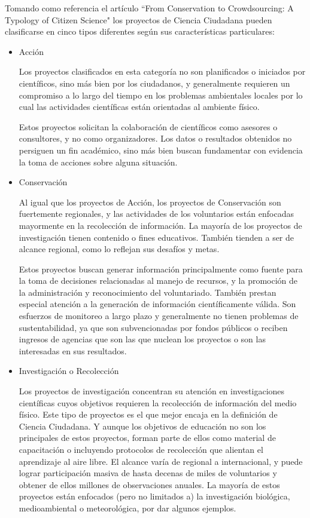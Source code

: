 	Tomando como referencia el artículo ``From Conservation to Crowdsourcing: A Typology of Citizen Science" los proyectos de Ciencia Ciudadana pueden clasificarse en cinco tipos diferentes según sus características particulares:

\begin{itemize}
	\item {Acción}
		
		Los proyectos clasificados en esta categoría no son planificados o iniciados por científicos, sino más bien por los ciudadanos, y generalmente requieren un compromiso a lo largo del tiempo en los problemas ambientales locales por lo cual las actividades científicas están orientadas al ambiente físico. 
		
		Estos proyectos solicitan la colaboración de científicos como asesores o consultores, y no como organizadores. Los datos o resultados obtenidos no persiguen un fin académico, sino más bien buscan fundamentar con evidencia la toma de acciones sobre alguna situación. 
	\item {Conservación} 
	
	Al igual que los proyectos de Acción, los proyectos de Conservación son fuertemente regionales, y las actividades de los voluntarios están enfocadas mayormente en la recolección de información. La mayoría de los proyectos de investigación tienen contenido o fines educativos. También tienden a ser de alcance regional, como lo reflejan sus desafíos y metas.
	
	Estos proyectos buscan generar información principalmente como fuente para la toma de decisiones relacionadas al manejo de recursos, y la promoción de la administración y reconocimiento del voluntariado. También prestan especial atención a la generación de información científicamente válida. Son esfuerzos de monitoreo a largo plazo y generalmente no tienen problemas de sustentabilidad, ya que son subvencionadas por fondos públicos o reciben ingresos de agencias que son las que nuclean los proyectos o son las interesadas en sus resultados.
	
	\item {Investigación o Recolección} 
	
	Los proyectos de investigación concentran su atención en investigaciones científicas cuyos objetivos requieren la recolección de información del medio físico. Este tipo de proyectos es el que mejor encaja en la definición de Ciencia Ciudadana. Y aunque los objetivos de educación no son los principales de estos proyectos, forman parte de ellos como material de capacitación o incluyendo protocolos de recolección que alientan el aprendizaje al aire libre. El alcance varía de regional a internacional, y puede lograr participación masiva de hasta decenas de miles de voluntarios y obtener de ellos millones de observaciones anuales. La mayoría de estos proyectos están enfocados (pero no limitados a) la investigación biológica, medioambiental o meteorológica, por dar algunos ejemplos. 
	

\end{itemize}
